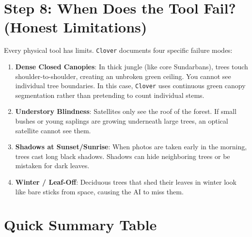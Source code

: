 \documentclass[11pt,a4paper]{article}
\begin{document}
\section{Step 8: When Does the Tool Fail? (Honest Limitations)}

Every physical tool has limits. \texttt{Clover} documents four specific failure modes:

\begin{enumerate}
    \item \textbf{Dense Closed Canopies}: In thick jungle (like core Sundarbans), trees touch shoulder-to-shoulder, creating an unbroken green ceiling. You cannot see individual tree boundaries. In this case, \texttt{Clover} uses continuous green canopy segmentation rather than pretending to count individual stems.
    \item \textbf{Understory Blindness}: Satellites only see the roof of the forest. If small bushes or young saplings are growing underneath large trees, an optical satellite cannot see them.
    \item \textbf{Shadows at Sunset/Sunrise}: When photos are taken early in the morning, trees cast long black shadows. Shadows can hide neighboring trees or be mistaken for dark leaves.
    \item \textbf{Winter / Leaf-Off}: Deciduous trees that shed their leaves in winter look like bare sticks from space, causing the AI to miss them.
\end{enumerate}

\section{Quick Summary Table}
\end{document}
